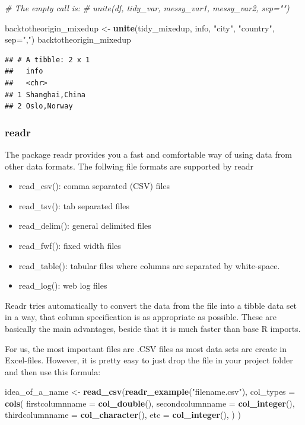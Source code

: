 \documentclass[]{report}
\newenvironment{Shaded}{\begin{snugshade}}{\end{snugshade}}
\newcommand{\KeywordTok}[1]{\textcolor[rgb]{0.13,0.29,0.53}{\textbf{#1}}}
\newcommand{\DataTypeTok}[1]{\textcolor[rgb]{0.13,0.29,0.53}{#1}}
\newcommand{\StringTok}[1]{\textcolor[rgb]{0.31,0.60,0.02}{#1}}
\newcommand{\CommentTok}[1]{\textcolor[rgb]{0.56,0.35,0.01}{\textit{#1}}}
\newcommand{\NormalTok}[1]{#1}
\providecommand{\tightlist}{%
  \setlength{\itemsep}{0pt}\setlength{\parskip}{0pt}}
\begin{document}
\begin{Shaded}
\begin{Highlighting}[]
\CommentTok{# The empty call is:}
\CommentTok{# unite(df, tidy_var, messy_var1, messy_var2, sep="")}


\NormalTok{backtotheorigin_mixedup <-}\StringTok{ }\KeywordTok{unite}\NormalTok{(tidy_mixedup, info, }\StringTok{"city"}\NormalTok{, }\StringTok{"country"}\NormalTok{, }\DataTypeTok{sep=}\StringTok{","}\NormalTok{)}
\NormalTok{backtotheorigin_mixedup}
\end{Highlighting}
\end{Shaded}

\begin{verbatim}
## # A tibble: 2 x 1
##   info          
##   <chr>         
## 1 Shanghai,China
## 2 Oslo,Norway
\end{verbatim}

\subsubsection{readr}\label{readr}

The package readr provides you a fast and comfortable way of using data
from other data formats. The follwing file formats are supported by
readr

\begin{itemize}
\tightlist
\item
  read\_csv(): comma separated (CSV) files
\item
  read\_tsv(): tab separated files
\item
  read\_delim(): general delimited files
\item
  read\_fwf(): fixed width files
\item
  read\_table(): tabular files where columns are separated by
  white-space.
\item
  read\_log(): web log files
\end{itemize}

Readr tries automatically to convert the data from the file into a
tibble data set in a way, that column specification is as appropriate as
possible. These are basically the main advantages, beside that it is
much faster than base R imports.

For us, the most important files are .CSV files as most data sets are
create in Excel-files. However, it is pretty easy to just drop the file
in your project folder and then use this formula:

\begin{Shaded}
\begin{Highlighting}[]
\NormalTok{idea_of_a_name <-}\StringTok{ }\KeywordTok{read_csv}\NormalTok{(}\KeywordTok{readr_example}\NormalTok{(}\StringTok{"filename.csv"}\NormalTok{), }\DataTypeTok{col_types =} 
  \KeywordTok{cols}\NormalTok{(}
    \DataTypeTok{firstcolumnname =} \KeywordTok{col_double}\NormalTok{(),}
    \DataTypeTok{secondcolumnname =} \KeywordTok{col_integer}\NormalTok{(),}
    \DataTypeTok{thirdcolumnname =} \KeywordTok{col_character}\NormalTok{(),}
    \DataTypeTok{etc =} \KeywordTok{col_integer}\NormalTok{(),}
\NormalTok{      )}
\NormalTok{)}
\end{Highlighting}
\end{Shaded}
\end{document}
